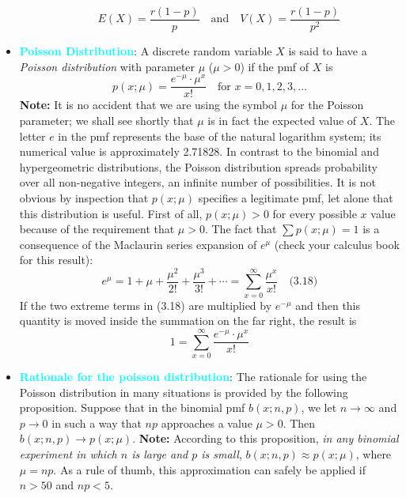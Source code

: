 \documentclass{report}
\begin{document}
\begin{itemize}
\begin{itemize}
            \[
                E(X) = \frac{r(1 - p)}{p} \quad \text{and} \quad V(X) = \frac{r(1 - p)}{p^2}
            \]
    \end{itemize}
    \item \textbf{\textcolor{cyan}{Poisson Distribution}}:
        A discrete random variable \( X \) is said to have a \textit{Poisson distribution} with parameter \( \mu \) (\( \mu > 0 \)) if the pmf of \( X \) is
        \[
        p(x; \mu) = \frac{e^{-\mu} \cdot \mu^x}{x!} \quad \text{for } x = 0, 1, 2, 3, \ldots
        \]
        \bigbreak \noindent 
        \textbf{Note:} 
        It is no accident that we are using the symbol \( \mu \) for the Poisson parameter; we shall see shortly that \( \mu \) is in fact the expected value of \( X \). The letter \( e \) in the pmf represents the base of the natural logarithm system; its numerical value is approximately 2.71828. In contrast to the binomial and hypergeometric distributions, the Poisson distribution spreads probability over all non-negative integers, an infinite number of possibilities.
        \bigbreak \noindent 
        It is not obvious by inspection that \( p(x; \mu) \) specifies a legitimate pmf, let alone that this distribution is useful. First of all, \( p(x; \mu) > 0 \) for every possible \( x \) value because of the requirement that \( \mu > 0 \). The fact that \( \sum p(x; \mu) = 1 \) is a consequence of the Maclaurin series expansion of \( e^\mu \) (check your calculus book for this result):
        \[
            e^\mu = 1 + \mu + \frac{\mu^2}{2!} + \frac{\mu^3}{3!} + \cdots = \sum_{x=0}^{\infty} \frac{\mu^x}{x!} \quad \text{(3.18)}
        \]
        If the two extreme terms in (3.18) are multiplied by \( e^{-\mu} \) and then this quantity is moved inside the summation on the far right, the result is
        \[
            1 = \sum_{x=0}^{\infty} \frac{e^{-\mu} \cdot \mu^x}{x!}
        \]
    \item \textbf{\textcolor{cyan}{Rationale for the poisson distribution}}:
        The rationale for using the Poisson distribution in many situations is provided by the following proposition.
        \bigbreak \noindent 
        Suppose that in the binomial pmf \( b(x; n, p) \), we let \( n \to \infty \) and \( p \to 0 \) in such a way that \( np \) approaches a value \( \mu > 0 \). Then \( b(x; n, p) \to p(x; \mu) \).
        \bigbreak \noindent 
        \textbf{Note:} According to this proposition, \textit{in any binomial experiment in which \( n \) is large and \( p \) is small}, \( b(x; n, p) \approx p(x; \mu) \), where \( \mu = np \). As a rule of thumb, this approximation can safely be applied if \( n > 50 \) and \( np < 5 \).

\end{itemize}
\end{document}
